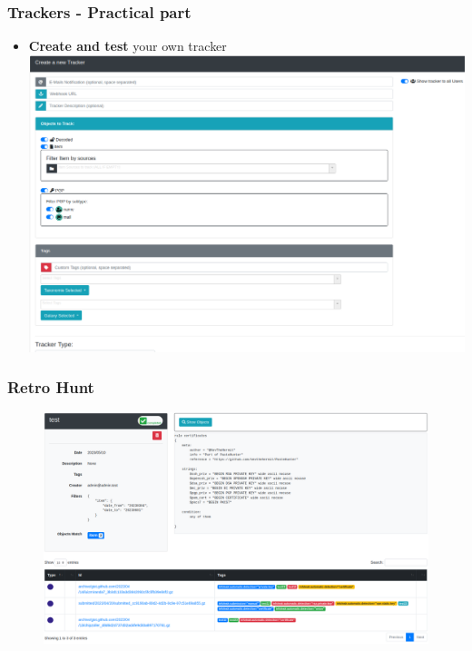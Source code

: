 \documentclass[10pt,aspectratio=169, colorlinks=true, linkcolor=circlBlue]{beamer}
\begin{document}
\begin{frame}
    \frametitle{Trackers - Practical part}
        \begin{itemize}
        	\item \textbf{Create and test} your own tracker
        	\includegraphics[scale=0.21]{screenshot/tracker_create.png}
        \end{itemize}
\end{frame}

\begin{frame}
    \frametitle{Retro Hunt}
        \begin{figure}
            \includegraphics[scale=0.22]{screenshot/retro_hunt.png}
        \end{figure}
\end{frame}
\end{document}
